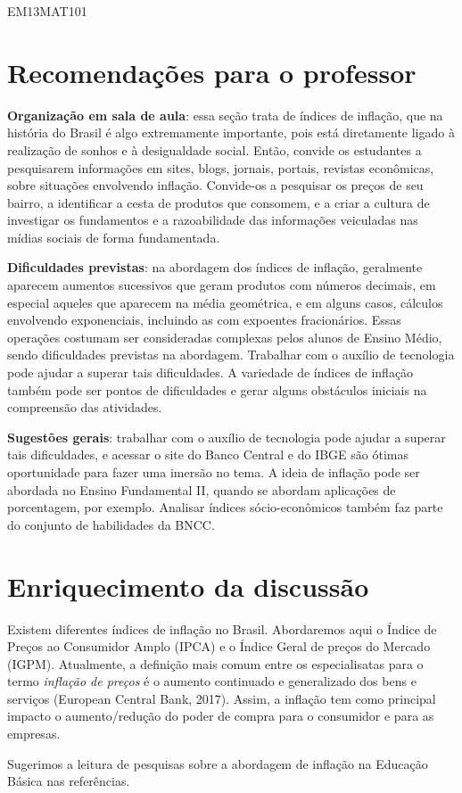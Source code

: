 \begin{paginatexto2}
\begin{objetivos}{EM13MAT101}
\end{objetivos}

\section*{Recomendações para o professor}

\textbf{Organização em sala de aula}: essa seção trata de índices de inflação, que na história do Brasil é algo extremamente importante, pois está diretamente ligado à realização de sonhos e à desigualdade social. Então, convide os estudantes a pesquisarem informações em sites, blogs, jornais, portais, revistas econômicas, sobre situações envolvendo inflação. Convide-os a pesquisar os preços de seu bairro, a identificar a cesta de produtos que consomem, e a criar a cultura de investigar os fundamentos e a razoabilidade das informações veiculadas nas mídias sociais de forma fundamentada.

\textbf{Dificuldades previstas}: na abordagem dos índices de inflação, geralmente aparecem aumentos sucessivos que geram produtos com números decimais, em especial aqueles que aparecem na média geométrica, e em alguns casos, cálculos envolvendo exponenciais, incluindo as com expoentes fracionários. Essas operações costumam ser consideradas complexas pelos alunos de Ensino Médio, sendo dificuldades previstas na abordagem. Trabalhar com o auxílio de tecnologia pode ajudar a superar tais dificuldades. A variedade de índices de inflação também pode ser pontos de dificuldades e gerar alguns obstáculos iniciais na compreensão das atividades.

\textbf{Sugestões gerais}: trabalhar com o auxílio de tecnologia pode ajudar a superar tais dificuldades, e acessar o site do Banco Central e do IBGE são ótimas oportunidade para fazer uma imersão no tema. A ideia de inflação pode ser abordada no Ensino Fundamental II, quando se abordam aplicações de porcentagem, por exemplo. Analisar índices sócio-econômicos também faz parte do conjunto de habilidades da BNCC.

\section*{Enriquecimento da discussão}

Existem diferentes índices de inflação no Brasil. Abordaremos aqui o Índice de Preços ao Consumidor Amplo (IPCA) e o Índice Geral de preços do Mercado (IGPM). Atualmente, a definição mais comum entre os especialisatas para o termo \textit{inflação de preços} é o aumento continuado e generalizado dos bens e serviços (European Central Bank, 2017). Assim, a inflação tem como principal impacto o aumento/redução do poder de compra para o consumidor e para as empresas.

Sugerimos a leitura de pesquisas sobre a abordagem de inflação na Educação Básica nas referências.
\end{paginatexto2}

